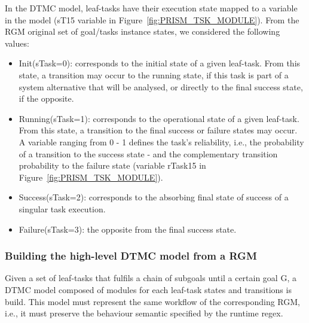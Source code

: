 In the DTMC model, leaf-tasks have their execution state mapped to a variable in the model (sT15 variable in Figure~\ref{fig:PRISM_TSK_MODULE}). From the RGM original set of goal/tasks instance states, we considered the following values:

\begin{itemize}

\item Init(sTask=0): corresponds to the initial state of a given leaf-task. From this state, a transition may occur to the running state, if this task is part of a system alternative that will be analysed, or directly to the final success state, if the opposite.
\medskip

\item Running(sTask=1): corresponds to the operational state of a given leaf-task. From this state, a transition to the final success or failure states may occur. A variable ranging from 0 - 1 defines the task's reliability, i.e., the probability of a transition to the success state - and the complementary transition probability to the failure state (variable rTask15 in Figure~\ref{fig:PRISM_TSK_MODULE}).
\medskip

\item Success(sTask=2): corresponds to the absorbing final state of success of a singular task execution.
\medskip

\item Failure(sTask=3): the opposite from the final success state.

\end{itemize}



\subsubsection{Building the high-level DTMC model from a RGM}


Given a set of leaf-tasks that fulfils a chain of subgoals until a certain goal G, a DTMC model composed of modules for each leaf-task states and transitions is build. This model must represent the same workflow of the corresponding RGM, i.e., it must preserve the behaviour semantic specified by the runtime regex.  

